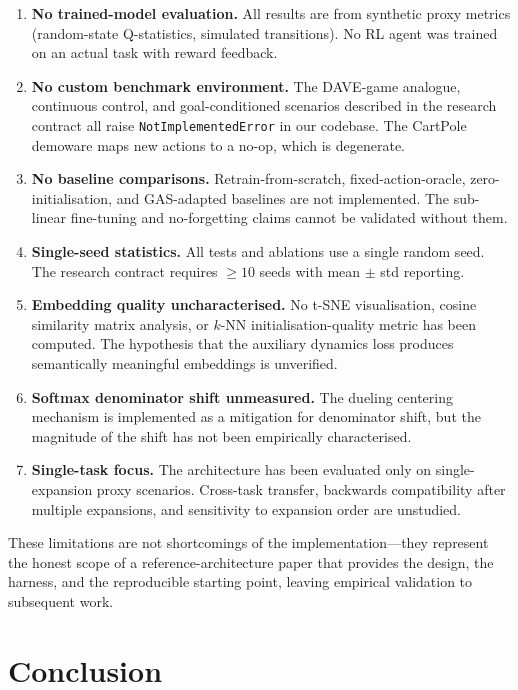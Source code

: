 \documentclass{article}
\begin{document}
\begin{enumerate}
  \item \textbf{No trained-model evaluation.} All results are from synthetic
  proxy metrics (random-state Q-statistics, simulated transitions). No RL
  agent was trained on an actual task with reward feedback.
  \item \textbf{No custom benchmark environment.} The DAVE-game analogue,
  continuous control, and goal-conditioned scenarios described in the research
  contract all raise \texttt{NotImplementedError} in our codebase. The CartPole
  demoware maps new actions to a no-op, which is degenerate.
  \item \textbf{No baseline comparisons.} Retrain-from-scratch,
  fixed-action-oracle, zero-initialisation, and GAS-adapted baselines are not
  implemented. The sub-linear fine-tuning and no-forgetting claims cannot be
  validated without them.
  \item \textbf{Single-seed statistics.} All tests and ablations use a single
  random seed. The research contract requires $\geq\!10$ seeds with
  mean $\pm$ std reporting.
  \item \textbf{Embedding quality uncharacterised.} No t-SNE visualisation,
  cosine similarity matrix analysis, or $k$-NN initialisation-quality metric
  has been computed. The hypothesis that the auxiliary dynamics loss produces
  semantically meaningful embeddings is unverified.
  \item \textbf{Softmax denominator shift unmeasured.} The dueling centering
  mechanism is implemented as a mitigation for denominator shift, but the
  magnitude of the shift has not been empirically characterised.
  \item \textbf{Single-task focus.} The architecture has been evaluated only
  on single-expansion proxy scenarios. Cross-task transfer, backwards
  compatibility after multiple expansions, and sensitivity to expansion order
  are unstudied.
\end{enumerate}

These limitations are not shortcomings of the implementation---they represent
the honest scope of a reference-architecture paper that provides the design,
the harness, and the reproducible starting point, leaving empirical validation
to subsequent work.


\section{Conclusion}
\label{sec:conclusion}
\end{document}
